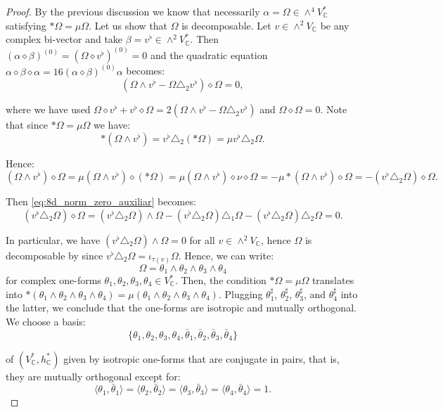 \documentclass[10pt,a4paper,twoside,reqno]{amsart}
\theoremstyle{plain}
\theoremstyle{definition}
\theoremstyle{remark}
\def\C{\mathbb{C}}
\newcommand{\escal}[1]{\langle#1\rangle}
\begin{document}
\begin{proof}
By the previous discussion we know that necessarily $\alpha=\Omega\in\wedge^4V^*_\C$ satisfying $*\Omega=\mu\Omega$. Let us show that $\Omega$ is decomposable. Let $v\in\wedge^2V_\C$ be any complex bi-vector and take $\beta=v^\flat\in\wedge^2V^*_\C$. Then $(\alpha\diamond\beta)^{(0)}=(\Omega\diamond v^\flat)^{(0)}=0$ and the quadratic equation $\alpha\diamond\beta\diamond\alpha=16(\alpha\diamond\beta)^{(0)}\alpha$ becomes:
\begin{equation}\label{eq:8d_norm_zero_auxiliar}
(\Omega\wedge v^\flat-\Omega\triangle_2 v^\flat)\diamond\Omega=0,
\end{equation}

\noindent
where we have used $\Omega\diamond v^\flat+v^\flat\diamond\Omega=2(\Omega\wedge v^\flat-\Omega\triangle_2 v^\flat)$ and $\Omega\diamond\Omega=0$. Note that since $*\Omega=\mu\Omega$ we have: $$*(\Omega\wedge v^\flat)=v^\flat\triangle_2(*\Omega)=\mu v^\flat\triangle_2\Omega.$$

Hence: $$(\Omega\wedge v^\flat)\diamond\Omega=\mu(\Omega\wedge v^\flat)\diamond(*\Omega)=\mu(\Omega\wedge v^\flat)\diamond\nu\diamond\Omega=-\mu*(\Omega\wedge v^\flat)\diamond\Omega=-(v^\flat\triangle_2\Omega)\diamond\Omega.$$

Then \eqref{eq:8d_norm_zero_auxiliar} becomes: $$(v^\flat\triangle_2\Omega)\diamond\Omega=(v^\flat\triangle_2\Omega)\wedge\Omega-(v^\flat\triangle_2\Omega)\triangle_1\Omega-(v^\flat\triangle_2\Omega)\triangle_2\Omega=0.$$

In particular, we have $(v^\flat\triangle_2\Omega)\wedge\Omega=0$ for all $v\in\wedge^2V_\C$, hence $\Omega$ is decomposable by \cite{EM00} since $v^\flat\triangle_2\Omega=\iota_{\tau(v)}\Omega$. Hence, we can write: $$\Omega=\theta_1\wedge\theta_2\wedge\theta_3\wedge\theta_4$$ for complex one-forms $\theta_1,\theta_2,\theta_3,\theta_4\in V^*_\C$. Then, the condition $*\Omega=\mu\Omega$ translates into $*(\theta_1\wedge\theta_2\wedge\theta_3\wedge\theta_4)=\mu(\theta_1\wedge\theta_2\wedge\theta_3\wedge\theta_4)$. Plugging $\theta_1^\sharp$, $\theta_2^\sharp$, $\theta_3^\sharp$, and $\theta_4^\sharp$ into the latter, we conclude that the one-forms are isotropic and mutually orthogonal. We choose a basis:
\begin{equation*}
\{\theta_1,\theta_2,\theta_3,\theta_4,\bar\theta_1,\bar\theta_2,\bar\theta_3,\bar\theta_4\}  
\end{equation*}

\noindent
of $(V^*_\C,h^*_\C)$ given by isotropic one-forms that are conjugate in pairs, that is, they are mutually orthogonal except for:
\begin{equation*}
\escal{\theta_1,\bar\theta_1}=\escal{\theta_2,\bar\theta_2}=\escal{\theta_3,\bar\theta_3}=\escal{\theta_4,\bar\theta_4}=1.    
\end{equation*}


\end{proof}
\end{document}
